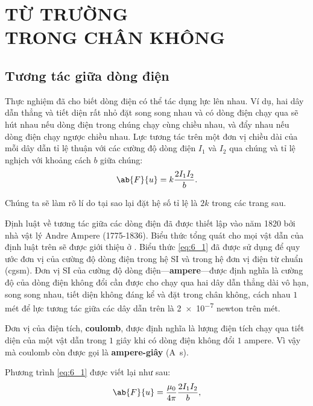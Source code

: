 

\chapter[TỪ TRƯỜNG TRONG CHÂN KHÔNG]{TỪ TRƯỜNG\\ TRONG CHÂN KHÔNG}\label{chap:6}

\section{Tương tác giữa dòng điện}\label{sec:6_1}
Thực nghiệm đã cho biết dòng điện có thể tác dụng lực lên nhau. Ví dụ, hai dây dẫn thẳng và tiết diện rất nhỏ đặt song song nhau và có dòng điện chạy qua sẽ hút nhau nếu dòng điện trong chúng chạy cùng chiều nhau, và đẩy nhau nếu dòng điện chạy ngược chiều nhau. Lực tương tác trên một đơn vị chiều dài của mỗi dây dẫn tỉ lệ thuận với các cường độ dòng điện $I_1$ và $I_2$ qua chúng và tỉ lệ nghịch với khoảng cách $b$ giữa chúng:
\begin{equation}\label{eq:6_1}
    \ab{F}{u} = k \frac{2 I_1 I_2}{b}.
\end{equation}

\noindent
Chúng ta sẽ làm rõ lí do tại sao lại đặt hệ số tỉ lệ là $2k$ trong các trang sau.

Định luật về tương tác giữa các dòng điện đã được thiết lập vào năm 1820 bởi nhà vật lý Andre Ampere (1775-1836). Biểu thức tổng quát cho mọi vật dẫn của định luật trên sẽ được giới thiệu ở . Biểu thức \eqref{eq:6_1} đã được sử dụng để quy ước đơn vị của cường độ dòng điện trong hệ SI và trong hệ đơn vị điện từ chuẩn (cgsm). Đơn vị SI của cường độ dòng điện---\textbf{ampere}---được định nghĩa là cường độ của dòng điện không đổi cần được cho chạy qua hai dây dẫn thẳng dài vô hạn, song song nhau, tiết diện không đáng kể và đặt trong chân không, cách nhau $1$ mét để lực tương tác giữa các dây dẫn trên là \num{2e-7} newton trên mét.

Đơn vị của điện tích, \textbf{coulomb}, được định nghĩa là lượng điện tích chạy qua tiết diện của một vật dẫn trong $1$ giây khi có dòng điện không đổi $1$ ampere. Vì vậy mà coulomb còn được gọi là \textbf{ampere-giây} (\si{\ampere\second}).

Phương trình \eqref{eq:6_1} được viết lại như sau:
\begin{equation}\label{eq:6_2}
    \ab{F}{u} = \frac{\mu_0}{4\pi} \frac{2 I_1 I_2}{b},
\end{equation}

